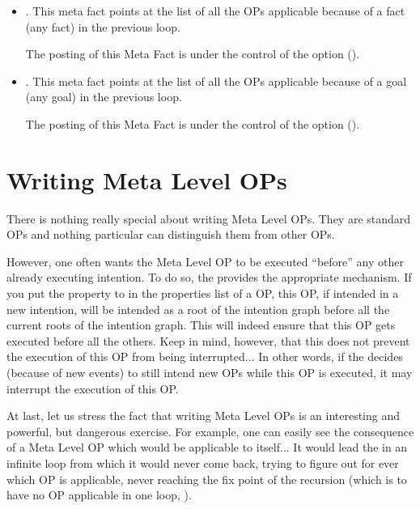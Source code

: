 \begin{itemize}
\item {}. This meta fact points at
the list of all the OPs applicable because of a fact (any fact) in the previous
loop.

The posting of this Meta Fact is under the control of the 
option ().

\item {}.  This meta fact points
at the list of all the OPs applicable because of a goal (any goal) in the
previous loop.

The posting of this Meta Fact is under the control of the 
option ().

\end{itemize}

\section{Writing Meta Level OPs}

There is nothing really special about writing Meta Level OPs. They are
standard OPs and nothing particular can distinguish them from other OPs.

However, one often wants the Meta Level OP to be executed ``before''
any other already executing intention. To do so, the \CPK{}
provides the appropriate mechanism. If you put the property
 to  in the properties list of a OP, this OP,
if intended in a new intention, will be intended as a root of the intention
graph before all the current roots of the intention graph. This will indeed
ensure that this OP gets executed before all the others. Keep in mind, however,
that this does not prevent the execution of this OP from being interrupted...
In other words, if the \CPK{} decides (because of new events) to still intend
new OPs while this OP is executed, it may interrupt the execution of this OP.

At last, let us stress the fact that writing Meta Level OPs is an interesting
and powerful, but dangerous exercise. For example, one can easily see the
consequence of a Meta Level OP which would be applicable to itself... It would
lead the \CPK{} in an infinite loop from which it would never come back, trying
to figure out for ever which OP is applicable, never reaching the fix point of
the recursion (which is to have no OP applicable in one loop, ).

